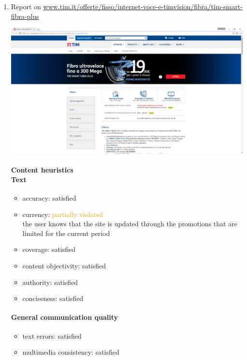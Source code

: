 \begin{enumerate}

\item Report on \url{www.tim.it/offerte/fisso/internet-voce-e-timvision/fibra/tim-smart-fibra-plus}

\begin{center}
	\includegraphics[width=\textwidth]{Screenshot/fibra.jpg}
\end{center}
\vspace{1cm}

	\paragraph*{Content heuristics \\ Text}
	\begin{itemize}
		\item accuracy: satisfied
		\item currency:  \textcolor{orange}{partially violated}\\
		the user knows that the site is updated through the promotions that are limited for the current period
		\item coverage: satisfied
		\item content objectivity: satisfied
		\item authority: satisfied
		\item conciseness: satisfied		
	\end{itemize}

	\paragraph*{General communication quality}
	\begin{itemize}
		\item text errors: satisfied
		\item multimedia consistency: satisfied
	\end{itemize}


\end{enumerate}
